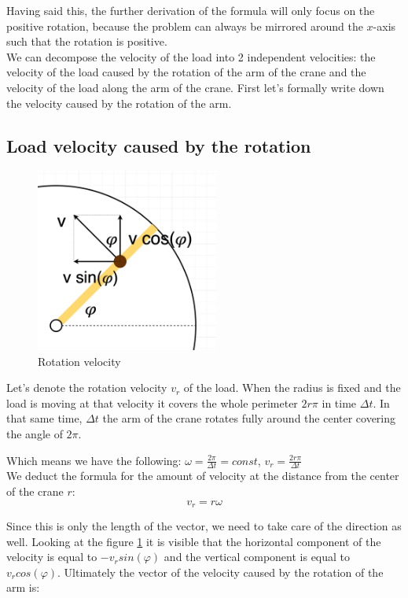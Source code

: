 \documentclass[11pt]{article}
\begin{document}
Having said this, the further derivation of the formula will only focus on the positive rotation, because the problem can always be mirrored around the $x$-axis such that the rotation is positive.\\

We can decompose the velocity of the load into 2 independent velocities: the velocity of the load caused by the rotation of the arm of the crane and the velocity of the load along the arm of the crane. First let's formally write down the velocity caused by the rotation of the arm.\\

\subsection{Load velocity caused by the rotation}

\begin{figure}[H]
\centering
\includegraphics[width=6cm]{rotation_velocity.jpg}
\caption{Rotation velocity}
\label{fig:rot_velocity}
\end{figure}

Let's denote the rotation velocity $v_r$ of the load. When the radius is fixed and the load is moving at that velocity it covers the whole perimeter $2r\pi$ in time $\Delta t$. In that same time, $\Delta t$ the arm of the crane rotates fully around the center covering the angle of $2\pi$.

Which means we have the following: \( \omega = \frac{2\pi}{\Delta t} = const \), \( v_r = \frac{2r\pi}{\Delta t} \)\\

We deduct the formula for the amount of velocity at the distance from the center of the crane $r$:
\[ v_r = r\omega \]

Since this is only the length of the vector, we need to take care of the direction as well. Looking at the figure \ref{fig:rot_velocity} it is visible that the horizontal component of the velocity is equal to $-v_rsin(\varphi)$ and the vertical component is equal to $v_rcos(\varphi)$. Ultimately the vector of the velocity caused by the rotation of the arm is:
\end{document}
